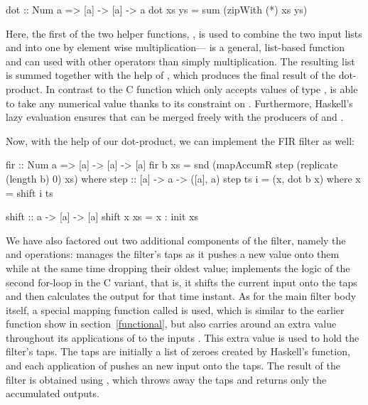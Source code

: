\documentclass[../main.tex]{subfiles}
\begin{document}
\begin{code}
dot :: Num a => [a] -> [a] -> a
dot xs ys = sum (zipWith (*) xs ys)
\end{code}

\noindent Here, the first of the two helper functions, , is used to combine the two input lists  and  into one by element wise multiplication--- is a general, list-based function and can used with other operators than simply multiplication. The resulting list is summed together with the help of , which produces the final result of the dot-product. In contrast to the C function which only accepts values of type ,  is able to take any numerical value thanks to its  constraint on . Furthermore, Haskell's lazy evaluation ensures that  can be merged freely with the producers of  and .

Now, with the help of our dot-product, we can implement the FIR filter as well:

\begin{code}
fir :: Num a => [a] -> [a] -> [a]
fir b xs = snd (mapAccumR step (replicate (length b) 0) xs)
  where
    step :: [a] -> a -> ([a], a)
    step ts i = (x, dot b x)
      where x = shift i ts
  
    shift :: a -> [a] -> [a]
    shift x xs = x : init xs
\end{code}

\noindent We have also factored out two additional components of the filter, namely the  and  operations:  manages the filter's taps as it pushes a new value onto them while at the same time dropping their oldest value;  implements the logic of the second for-loop in the C variant, that is, it shifts the current input onto the taps and then calculates the output for that time instant. As for the main filter body itself, a special mapping function called  is used, which is similar to the earlier  function show in section~\ref{functional}, but also carries around an extra value throughout its applications of  to the inputs . This extra value is used to hold the filter's taps. The taps are initially a list of zeroes created by Haskell's  function, and each application of  pushes an new input onto the taps. The result of the filter is obtained using , which throws away the taps and returns only the accumulated outputs.
\end{document}

